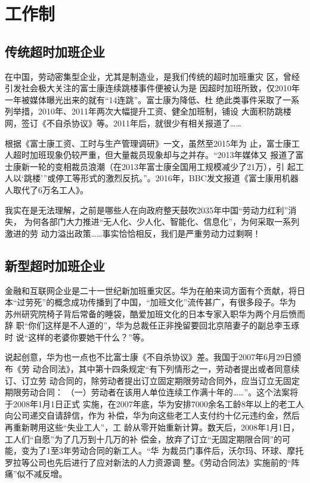 \chapter{工作制}

\section{传统超时加班企业}

在中国，劳动密集型企业，尤其是制造业，是我们传统的超时加班重灾
区\cite{guojilaogongshijian}，曾经引发社会极大关注的富士康连续跳楼事件便被认为是
因超时加班所致，仅2010年一年被媒体曝光出来的就有“14连跳”。富士康为降低、杜
绝此类事件采取了一系列举措，2010年、2011年两次大幅提升工资、健全加班制，铺设
大面积防跳楼网，签订《不自杀协议》等。2011年后，就很少有相关报道了……

根据《富士康工资、工时与生产管理调研》\cite{fushikangzuixin}一文，虽然至2015年为
止，富士康工人超时加班现象仍较严重，但大量裁员现象却与之并存。“2013年媒体又
报道了富士康新一轮的变相裁员浪潮（在2013年富士康全国用工规模减少了21万），引
起工人以`跳楼'”或停工等形式的激烈反抗。”。2016年，BBC发文报道《富士康用机器
人取代了6万名工人》。

我实在是无法理解，之前是哪些人在向政府整天鼓吹2035年中国“劳动力红利”消失，
为何各部门大力推进“无人化、少人化、智能化、信息化”，为何采取一系列激进的劳
动力溢出政策……事实恰恰相反，我们是严重劳动力过剩啊！


\section{新型超时加班企业}

金融和互联网企业是二十一世纪新加班重灾区。华为在舶来词方面有个贡献，将日
本“过劳死”的概念成功传播到了中国，“加班文化”流传甚广，有很多段子。华为
苏州研究院椅子背后常备的睡袋，酷爱加班文化的日本专家入职华为两个月后愤而辞
职“你们这样是不人道的”，华为总裁任正非挽留要回北京陪妻子的副总李玉琢时
说“这样的老婆你要她干什么？”等。

说起创意，华为也一点也不比富士康《不自杀协议》差。我国于2007年6月29日颁布《劳
动合同法》，其中第十四条规定“有下列情形之一，劳动者提出或者同意续订、订立劳
动合同的，除劳动者提出订立固定期限劳动合同外，应当订立无固定期限劳动合同：
（一）劳动者在该用人单位连续工作满十年的……”。这个法案将于2008年1月1日正式
实施，在2007年底，华为安排7000余名工龄8年以上的老工人向公司递交自请辞信，作为
补偿，华为向这些老工人支付约十亿元违约金，然后再重新聘用这些“失业工人”，工
龄从零开始重新计算。数天后，2008年1月1日，工人们“自愿”为了几万到十几万的补
偿金，放弃了订立“无固定期限合同”的可能，变为了1至3年劳动合同的新工人。“华
为裁员门事件后，沃尔玛、环球、摩托罗拉等公司也先后进行了应对新法的人力资源调
整。《劳动合同法》实施前的“阵痛”似不减反增。\cite{huaweimaiduan}

